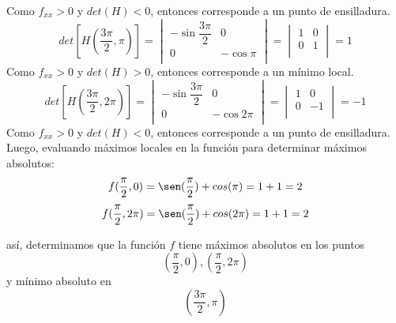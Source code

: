 \documentclass[a4paper,12pt]{article}
\begin{document}
		Como $f_{xx} > 0$ y $det(H) < 0$, entonces corresponde a un punto de ensilladura.\\
		$$det[H(\frac{3\pi}{2}, \pi)] =
			\begin{vmatrix}
				-\sin \dfrac{3\pi}{2} & 0 \\
				0  & - \cos \pi \\
			\end{vmatrix} =
			\begin{vmatrix}
				1 & 0 \\
				 0 & 1 \\
			\end{vmatrix} = 1$$
		Como $f_{xx} > 0$ y $det(H) > 0$, entonces corresponde a un mínimo local.\\
		$$det[H(\frac{3\pi}{2}, 2\pi)] =
			\begin{vmatrix}
				-\sin \dfrac{3\pi}{2} & 0 \\
				0  & - \cos 2\pi \\
			\end{vmatrix} =
			\begin{vmatrix}
				1 & 0 \\
				 0 & -1 \\
			\end{vmatrix} = -1$$
		Como $f_{xx} > 0$ y $det(H) < 0$, entonces corresponde a un punto de ensilladura.\\


		Luego, evaluando máximos locales en la función para determinar
		máximos absolutos:
			$$ f(\frac{\pi}{2}, 0) = \sen(\frac{\pi}{2}) + cos(\pi) = 1 + 1 = 2 $$
			$$ f(\frac{\pi}{2}, 2\pi) = \sen(\frac{\pi}{2}) + cos(2\pi) = 1 + 1 = 2$$

		así, determinamos que la función $f$ tiene máximos absolutos en los puntos
			$$(\frac{\pi}{2}, 0), (\frac{\pi}{2}, 2\pi)$$
		y mínimo absoluto en
			$$(\frac{3\pi}{2}, \pi)$$
\end{document}
